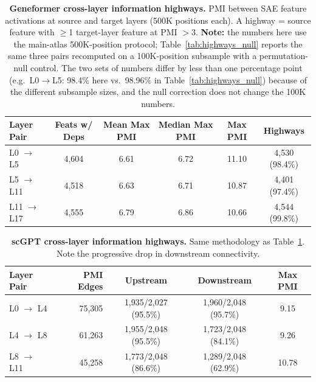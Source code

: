 \documentclass[onecolumn]{article}
\begin{document}
\begin{table}[H]
\centering
\caption{\textbf{Geneformer cross-layer information highways.} PMI between SAE feature activations at source and target layers (500K positions each). A highway = source feature with $\geq$1 target-layer feature at PMI $> 3$. \textbf{Note:} the numbers here use the main-atlas 500K-position protocol; Table~\ref{tab:highways_null} reports the same three pairs recomputed on a 100K-position subsample with a permutation-null control. The two sets of numbers differ by less than one percentage point (e.g.\ L0$\to$L5: 98.4\% here vs.\ 98.96\% in Table~\ref{tab:highways_null}) because of the different subsample sizes, and the null correction does not change the 100K numbers.}
\label{tab:highways}
\smallskip
\begin{tabular}{lccccc}
\toprule
Layer Pair & Feats w/ Deps & Mean Max PMI & Median Max PMI & Max PMI & Highways \\
\midrule
L0 $\to$ L5   & 4,604 & 6.61 & 6.72 & 11.10 & 4,530 (98.4\%) \\
L5 $\to$ L11  & 4,518 & 6.63 & 6.71 & 10.87 & 4,401 (97.4\%) \\
L11 $\to$ L17 & 4,555 & 6.79 & 6.86 & 10.66 & 4,544 (99.8\%) \\
\bottomrule
\end{tabular}
\end{table}


\begin{table}[H]
\centering
\caption{\textbf{scGPT cross-layer information highways.} Same methodology as Table~\ref{tab:highways}. Note the progressive drop in downstream connectivity.}
\label{tab:scgpt_highways}
\smallskip
\begin{tabular}{lrccc}
\toprule
Layer Pair & PMI Edges & Upstream & Downstream & Max PMI \\
\midrule
L0 $\to$ L4  & 75,305 & 1,935/2,027 (95.5\%) & 1,960/2,048 (95.7\%) & 9.15 \\
L4 $\to$ L8  & 61,263 & 1,955/2,048 (95.5\%) & 1,723/2,048 (84.1\%) & 9.26 \\
L8 $\to$ L11 & 45,258 & 1,773/2,048 (86.6\%) & 1,289/2,048 (62.9\%) & 10.78 \\
\bottomrule
\end{tabular}
\end{table}
\end{document}
